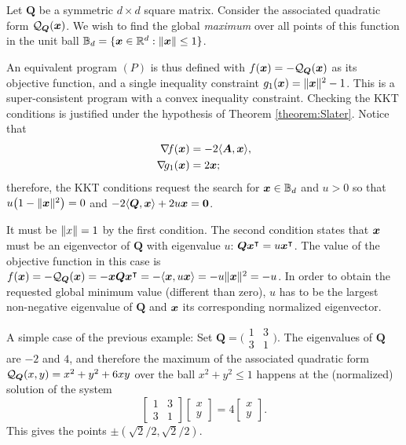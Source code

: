 \begin{example}
Let $\boldsymbol{Q}$ be a symmetric $d \times d$ square matrix.  Consider the associated quadratic form $\mathcal{Q}_{\boldsymbol{Q}}(\boldsymbol{x})$.  We wish to find the global \emph{maximum} over all points of this function in the unit ball $\mathbb{B}_d = \{ \boldsymbol{x} \in \mathbb{R}^d : \lVert \boldsymbol{x} \rVert \leq 1 \}$.

An equivalent program $(P)$ is thus defined with $f(\boldsymbol{x}) = -\mathcal{Q}_{\boldsymbol{Q}}(\boldsymbol{x})$ as its objective function, and a single inequality constraint $g_1(\boldsymbol{x}) = \lVert \boldsymbol{x} \rVert^2-1$.  This is a super-consistent program with a convex inequality constraint.  Checking the KKT conditions is justified under the hypothesis of Theorem \ref{theorem:Slater}.  Notice that 
\begin{align*}
\mathop{\nabla\! {f}}(\boldsymbol{x}) &= -2 \langle \boldsymbol{A}, \boldsymbol{x} \rangle, \\
\mathop{\nabla\! {g_1}}(\boldsymbol{x}) &= 2\boldsymbol{x};
\end{align*}
therefore, the KKT conditions request the search for $\boldsymbol{x} \in \mathbb{B}_d$ and $u >0$ so that $u\big(1-\lVert \boldsymbol{x} \rVert^2 \big)=0$ and $-2\langle \boldsymbol{Q}, \boldsymbol{x} \rangle + 2u\boldsymbol{x} = \boldsymbol{0}$.  

It must be $\lVert x \rVert=1$ by the first condition.  The second condition states that $\boldsymbol{x}$ must be an eigenvector of $\boldsymbol{Q}$ with eigenvalue $u$: $\boldsymbol{Q} {\boldsymbol{x}}^\intercal = u {\boldsymbol{x}}^\intercal$.  The value of the objective function in this case is $f(\boldsymbol{x}) = -\mathcal{Q}_{\boldsymbol{Q}}(\boldsymbol{x}) = -\boldsymbol{x} \boldsymbol{Q} {\boldsymbol{x}}^\intercal = -\langle \boldsymbol{x}, u\boldsymbol{x} \rangle = -u \lVert \boldsymbol{x} \rVert^2= -u$.  In order to obtain the requested global minimum value (different than zero), $u$ has to be the largest non-negative eigenvalue of $\boldsymbol{Q}$ and $\boldsymbol{x}$ its corresponding normalized eigenvector.
\end{example}

\begin{example}
A simple case of the previous example: Set $\boldsymbol{Q} = \big( \begin{smallmatrix} 1 & 3 \\ 3 & 1 \end{smallmatrix}\big)$.  The eigenvalues of $\boldsymbol{Q}$ are $-2$ and $4$, and therefore the maximum of the associated quadratic form $\mathcal{Q}_{\boldsymbol{Q}}(x,y) = x^2+y^2+6xy$ over the ball $x^2+y^2\leq 1$ happens at the (normalized) solution of the system
\begin{equation*}
\begin{bmatrix} 1 & 3 \\ 3 & 1 \end{bmatrix} \begin{bmatrix} x \\ y \end{bmatrix} = 4\begin{bmatrix} x \\ y \end{bmatrix}.
\end{equation*}
This gives the points $\pm(\sqrt{2}/2, \sqrt{2}/2)$.
\end{example}

